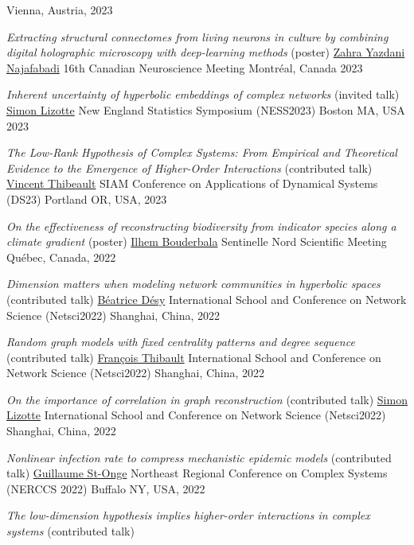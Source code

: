\documentclass[11pt]{article}
\makeatletter
\newcommand{\reversearabic}[1]{\expandafter\@reversearabic\csname c@#1\endcsname}
\newcommand{\@reversearabic}[1]{%
  \number\numexpr\getrefnumber{this@etaremune@\romannumeral\c@etaremune}-#1+1\relax
}
\newcounter{etaremune}
\newenvironment{etaremune}[1][]{%
  \stepcounter{etaremune}%
  \begin{enumerate}[label=\reversearabic*.,#1]%
}{%
  \edef\@currentlabel{\the\csname c@\@enumctr\endcsname}%
  \label{this@etaremune@\romannumeral\c@etaremune}%
  \end{enumerate}%
}
\makeatother
\begin{document}
\begin{etaremune}[itemsep=0.5em, label={[M\reversearabic*]}, first*=\small\vspace{0.5\baselineskip}]
{  Vienna, Austria, 2023}
%
  \item \parbox[t]{\textwidth-30pt}{\textit{Extracting structural connectomes from living neurons in culture by combining digital holographic microscopy with deep-learning methods} (poster)\split
  \uline{Zahra Yazdani Najafabadi}\split
  16th Canadian Neuroscience Meeting\split
  Montréal, Canada 2023}
%
  \item \parbox[t]{\textwidth-30pt}{\textit{Inherent uncertainty of hyperbolic embeddings of complex networks} (invited talk)\split
  \uline{Simon Lizotte}\split
  New England Statistics Symposium (NESS2023)\split
  Boston MA, USA 2023}
%
  \item \parbox[t]{\textwidth-30pt}{\textit{The Low-Rank Hypothesis of Complex Systems: From Empirical and Theoretical Evidence to the Emergence of Higher-Order Interactions} (contributed talk)\split
  \uline{Vincent Thibeault}\split
  SIAM Conference on Applications of Dynamical Systems (DS23)\split
  Portland OR, USA, 2023}
%
  \item \parbox[t]{\textwidth-30pt}{\textit{On the effectiveness of reconstructing biodiversity from indicator species along a climate gradient} (poster)\split
  \uline{Ilhem Bouderbala}\split
  Sentinelle Nord Scientific Meeting\split
  Québec, Canada, 2022}
%
  \item \parbox[t]{\textwidth-30pt}{\textit{Dimension matters when modeling network communities in hyperbolic spaces} (contributed talk)\split
  \uline{Béatrice Désy}\split
  International School and Conference on Network Science (Netsci2022)\split
  Shanghai, China, 2022}
%
  \item \parbox[t]{\textwidth-30pt}{\textit{Random graph models with fixed centrality patterns and degree sequence} (contributed talk)\split
  \uline{François Thibault}\split
  International School and Conference on Network Science (Netsci2022)\split
  Shanghai, China, 2022}
%
  \item \parbox[t]{\textwidth-30pt}{\textit{On the importance of correlation in graph reconstruction} (contributed talk)\split
  \uline{Simon Lizotte}\split
  International School and Conference on Network Science (Netsci2022)\split
  Shanghai, China, 2022}
%
  \item \parbox[t]{\textwidth-30pt}{\textit{Nonlinear infection rate to compress mechanistic epidemic models} (contributed talk)\split
  \uline{Guillaume St-Onge}\split
  Northeast Regional Conference on Complex Systems (NERCCS 2022)\split
  Buffalo NY, USA, 2022}
%
  \item \parbox[t]{\textwidth-30pt}{\textit{The low-dimension hypothesis implies higher-order interactions in complex systems} (contributed talk)\split
}
\end{etaremune}
\end{document}

